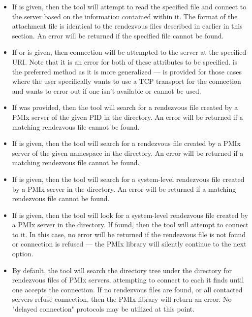 \begin{itemize}
%
\item If  is given, then the tool will attempt to read the specified file and connect to the server based on the information contained within it. The format of the attachment file is identical to the rendezvous files described in earlier in this section. An error will be returned if the specified file cannot be found.
%
\item If  or  is given, then connection will be attempted to the server at the specified \ac{URI}. Note that it is an error for both of these attributes to be specified.  is the preferred method as it is more generalized —  is provided for those cases where the user specifically wants to use a \ac{TCP} transport for the connection and wants to error out if one isn’t available or cannot be used.
%
\item If  was provided, then the tool will search for a rendezvous file created by a \ac{PMIx} server of the given \ac{PID} in the  directory. An error will be returned if a matching rendezvous file cannot be found.
%
\item If  is given, then the tool will search for a rendezvous file created by a \ac{PMIx} server of the given namespace in the  directory. An error will be returned if a matching rendezvous file cannot be found.
%
\item If  is given, then the tool will search for a system-level rendezvous file created by a \ac{PMIx} server in the  directory. An error will be returned if a matching rendezvous file cannot be found.
%
\item If  is given, then the tool will look for a system-level rendezvous file created by a \ac{PMIx} server in the  directory. If found, then the tool will attempt to connect to it. In this case, no error will be returned if the rendezvous file is not found or connection is refused — the \ac{PMIx} library will silently continue to the next option.
%
\item By default, the tool will search the directory tree under the  directory for rendezvous files of \ac{PMIx} servers, attempting to connect to each it finds until one accepts the connection. If no rendezvous files are found, or all contacted servers refuse connection, then the \ac{PMIx} library will return an error. No "delayed connection" protocols may be utilized at this point.
%
\end{itemize}

